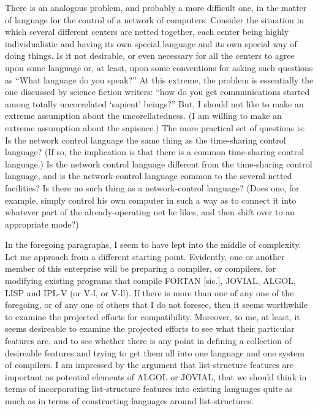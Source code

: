 \documentclass{article}
\begin{document}
There is an analogous problem, and probably a more difficult one, in the matter of language for the control of a network of computers. Consider the situation in which several different centers are netted together, each center being highly individualistic and having its own special language and its own special way of doing things. Is it not desirable, or even necessary for all the centers to agree upon some language or, at least, upon some conventions for asking such questions as ``What language do you speak?'' At this extreme, the problem is essentially the one discussed by science fiction writers: ``how do you get communications started among totally uncorrelated `sapient' beings?'' But, I should not like to make an extreme assumption about the uncorellatedness. (I am willing to make an extreme assumption about the sapience.) The more practical set of questions is: Is the network control language the same thing as the time-sharing control language? (If so, the implication is that there is a common time-sharing control language.) Is the network control language different from the time-sharing control language, and is the network-control language common to the several netted facilities? Is there no such thing as a network-control language? (Does one, for example, simply control his own computer in such a way as to connect it into whatever part of the already-operating net he likes, and then shift over to an appropriate mode?)

In the foregoing paragraphs, I seem to have lept into the middle of complexity. Let me approach from a different starting point. Evidently, one or another member of this enterprise will be preparing a compiler, or compilers, for modifying existing programs that compile FORTAN [sic.], JOVIAL, ALGOL, LISP and IPL-V (or V-l, or V-ll). If there is more than one of any one of the foregoing, or of any one of others that I do not foresee, then it seems worthwhile to examine the projected efforts for compatibility. Moreover, to me, at least, it seems desireable to examine the projected efforts to see what their particular features are, and to see whether there is any point in defining a collection of desireable features and trying to get them all into one language and one system of compilers. I am impressed by the argument that list-structure features are important as potential elements of ALGOL or JOVIAL, that we should think in terms of incorporating list-structure features into existing languages quite as much as in terms of constructing languages around list-structures.
\end{document}
